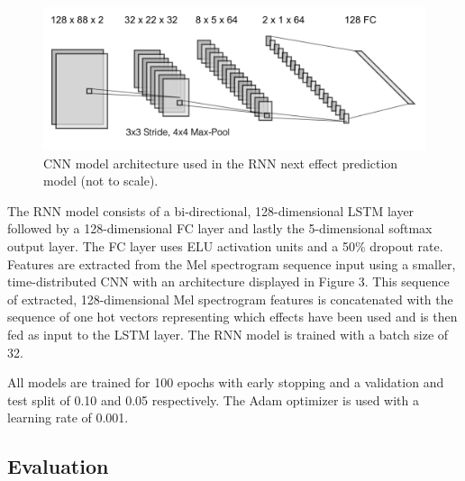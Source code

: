 \documentclass{article}
\begin{document}
\begin{figure}[ht]
  \centering
  \includegraphics[width=0.72\linewidth]{images/rnn_cnn.png}
  \caption{CNN model architecture used in the RNN next effect prediction model (not to scale).}
\end{figure}

The RNN model consists of a bi-directional, 128-dimensional LSTM layer followed by a 128-dimensional FC layer and lastly the 5-dimensional softmax output layer. The FC layer uses ELU activation units and a 50\% dropout rate. Features are extracted from the Mel spectrogram sequence input using a smaller, time-distributed CNN with an architecture displayed in Figure 3. This sequence of extracted, 128-dimensional Mel spectrogram features is concatenated with the sequence of one hot vectors representing which effects have been used and is then fed as input to the LSTM layer. The RNN model is trained with a batch size of 32.

All models are trained for 100 epochs with early stopping and a validation and test split of 0.10 and 0.05 respectively. The Adam optimizer is used with a learning rate of 0.001.

\subsection{Evaluation}
\end{document}
